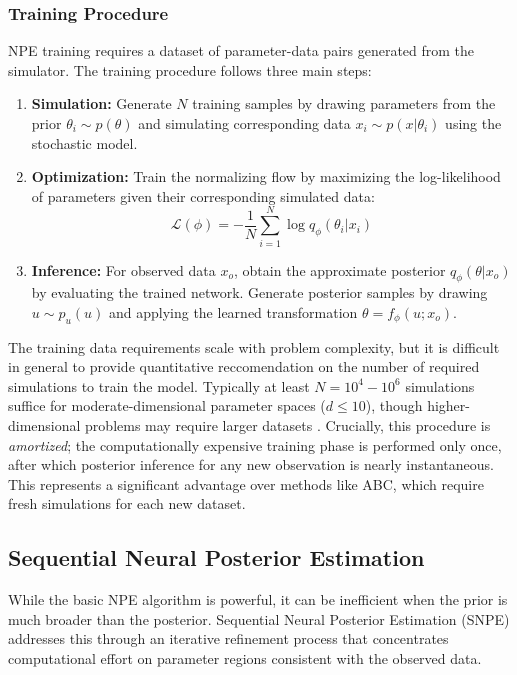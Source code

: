 \documentclass{article}
\begin{document}
\subsubsection{Training Procedure}

NPE training requires a dataset of parameter-data pairs generated from the simulator. The training procedure follows three main steps:

\begin{enumerate}
	\item \textbf{Simulation:} Generate $N$ training samples by drawing parameters from the prior $\theta_i \sim p(\theta)$ and simulating corresponding data $x_i \sim p(x|\theta_i)$ using the stochastic model.
	
	\item \textbf{Optimization:} Train the normalizing flow by maximizing the log-likelihood of parameters given their corresponding simulated data:
	\begin{equation}
		\mathcal{L}(\phi) = -\frac{1}{N} \sum_{i=1}^N \log q_\phi(\theta_i | x_i)
	\end{equation}
	
	\item \textbf{Inference:} For observed data $x_o$, obtain the approximate posterior $q_\phi(\theta | x_o)$ by evaluating the trained network. Generate posterior samples by drawing $u \sim p_u(u)$ and applying the learned transformation $\theta = f_\phi(u; x_o)$.
\end{enumerate}
The training data requirements scale with problem complexity, but it is difficult in general to provide quantitative reccomendation on the number of required simulations to train the model. Typically at least $N = 10^4 - 10^6$ simulations suffice for moderate-dimensional parameter spaces ($d \leq 10$), though higher-dimensional problems may require larger datasets \citep{2025arXiv250812939D}. Crucially, this procedure is \textit{amortized}; the computationally expensive training phase is performed only once, after which posterior inference for any new observation is nearly instantaneous. This represents a significant advantage over methods like ABC, which require fresh simulations for each new dataset.

\subsection{Sequential Neural Posterior Estimation}

While the basic NPE algorithm is powerful, it can be inefficient when the prior is much broader than the posterior. Sequential Neural Posterior Estimation (SNPE) \citep{papamakarios2016fast, greenberg2019automatic} addresses this through an iterative refinement process that concentrates computational effort on parameter regions consistent with the observed data.
\end{document}

